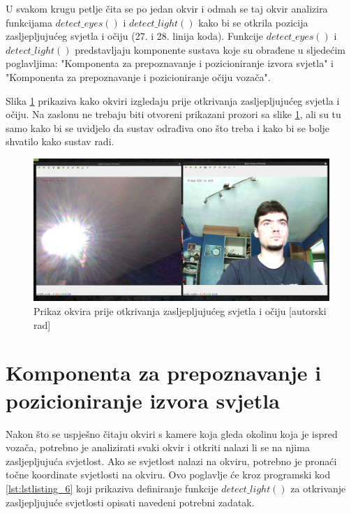 \documentclass{foi}
\begin{document}
U svakom krugu petlje čita se po jedan okvir i odmah se taj okvir analizira funkcijama $detect\_eyes()$ i $detect\_light()$ kako bi se otkrila pozicija zasljepljujućeg svjetla i očiju (27. i 28. linija koda). Funkcije $detect\_eyes()$ i $detect\_light()$ predstavljaju komponente sustava koje su obrađene u sljedećim poglavljima: "Komponenta za prepoznavanje i pozicioniranje izvora svjetla" i "Komponenta za prepoznavanje i pozicioniranje očiju vozača".

Slika \ref{fig:sustav1} prikaziva kako okviri izgledaju prije otkrivanja zasljepljujućeg svjetla i očiju. Na zaslonu ne trebaju biti otvoreni prikazani prozori sa slike \ref{fig:sustav1}, ali su tu samo kako bi se uvidjelo da sustav odrađiva ono što treba i kako bi se bolje shvatilo kako sustav radi.

\begin{figure}[h!]
    \centering
    \includegraphics[width=1\textwidth]{slike/sustav1}
    \caption{Prikaz okvira prije otkrivanja zasljepljujućeg svjetla i očiju [autorski rad]}
    \label{fig:sustav1}
\end{figure}

\pagebreak
\section{Komponenta za prepoznavanje i pozicioniranje izvora svjetla}

Nakon što se uspješno čitaju okviri s kamere koja gleda okolinu koja je ispred vozača, potrebno je analizirati svaki okvir i otkriti nalazi li se na njima zasljepljujuća svjetlost. Ako se svjetlost nalazi na okviru, potrebno je pronaći točne koordinate svjetlosti na okviru. Ovo poglavlje će kroz programski kod \ref{lst:lstlisting_6} koji prikaziva definiranje funkcije $detect\_light()$ za otkrivanje zasljepljujuće svjetlosti opisati navedeni potrebni zadatak.
\end{document}
